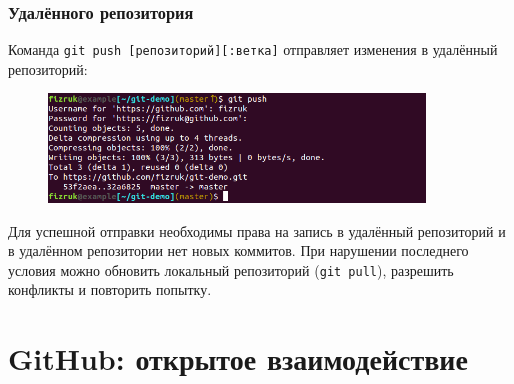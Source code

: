 \documentclass{beamer}
\begin{document}
\begin{frame}
  \frametitle{Удалённого репозитория}
  Команда \texttt{git push [репозиторий][:ветка]} отправляет
  изменения в удалённый репозиторий:

  \begin{figure}
    \includegraphics[width=10cm]{images/git-push.png}
  \end{figure}

  Для успешной отправки необходимы права на запись в удалённый репозиторий и в удалённом
  репозитории нет новых коммитов. При нарушении последнего условия можно обновить локальный
  репозиторий (\texttt{git pull}), разрешить конфликты и повторить попытку.
\end{frame}

\section{GitHub: открытое взаимодействие}
\end{document}
